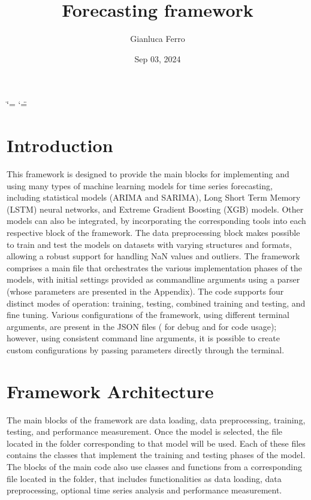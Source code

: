 \documentclass[letterpaper,10pt,english]{sphinxmanual}
\title{Forecasting framework}
\date{Sep 03, 2024}
\author{Gianluca Ferro}
\begin{document}
\ifdefined\shorthandoff
  \ifnum\catcode`\=\string=\active\shorthandoff{=}\fi
  \ifnum\catcode`\"=\active{}\fi
\fi

\pagestyle{empty}
\sphinxmaketitle
\pagestyle{plain}
\sphinxtableofcontents
\pagestyle{normal}
\label{\detokenize{index::doc}}



\chapter{Introduction}
\label{\detokenize{index:introduction}}
\sphinxAtStartPar
This framework is designed to provide the main blocks for implementing and using many types of machine learning models for time series forecasting, including
statistical models (ARIMA and SARIMA), Long Short Term Memory (LSTM) neural networks, and Extreme Gradient Boosting (XGB) models.
Other models can also be integrated, by incorporating the corresponding tools into each respective block of the framework.
The data preprocessing block makes possible to train and test the models on datasets with varying structures and formats, allowing a robust
support for handling NaN values and outliers.
The framework comprises a main file that orchestrates the various implementation phases of the models,
with initial settings provided as
command\sphinxhyphen{}line arguments using a parser (whose parameters are presented in the Appendix).
The code supports four distinct modes of operation: training, testing, combined training and testing, and fine tuning.
Various configurations of the framework, using different terminal arguments, are present in the JSON files ( for debug and  for
code usage); however, using consistent command line arguments, it is possible to create custom configurations
by passing parameters directly through the terminal.


\chapter{Framework Architecture}
\label{\detokenize{index:framework-architecture}}
\sphinxAtStartPar
The main blocks of the framework are data loading, data preprocessing, training, testing, and performance measurement.
Once the model is selected, the  file located in the  folder corresponding to that model will be used.
Each of these files contains the classes that implement the training and testing phases of the model.
The blocks of the main code also use classes and functions from a corresponding file located in the  folder,
that includes functionalities as data loading, data preprocessing, optional time series analysis and performance measurement.
\end{document}
